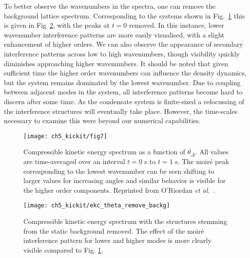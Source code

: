     To better observe the wavenumbers in the spectra, one can remove the background lattice spectrum. Corresponding to the systems shown in Fig.~\ref{fig:dtheta_kspec} this is given in Fig~\ref{fig:dtheta_kspec_backg}, with the peaks at $t=0$ removed. In this instance, lower wavenumber interference patterns are more easily visualised, with a slight enhancement of higher orders. We can also observe the appearance of secondary interference patterns across low to high wavenumbers, though visibility quickly diminishes approaching higher wavenumbers. It should be noted that given sufficient time the higher order wavenumbers can influence the density dynamics, but the system remains dominated by the lowest wavenumber. Due to coupling between adjacent modes in the system, all interference patterns become hard to discern after some time. As the condensate system is finite-sized a refocussing of the interference structures will eventually take place. However, the time-scales necessary to examine this were beyond our numerical capabilities.


	\begin{figure}
        \centering
		\texttt{[image: ch5\_kickit/fig7]}
		\caption[Compressible kinetic energy spectrum as a function of $\theta_\Delta$.]{Compressible kinetic energy spectrum as a function of $\theta_\Delta$. All values are time-averaged over an interval $t=0$ s to $t=1$ s. The moir\'e peak corresponding to the lowest wavenumber can be seen shifting to larger values for increasing angles and similar behavior is visible for the higher order components. Reprinted from O'Riordan {\textit{et al}.}~\cite{VTX:oriordan_pra_2016}.}
		\label{fig:dtheta_kspec}
	\end{figure}
    \begin{figure}
        \centering
        \texttt{[image: ch5\_kickit/ekc\_theta\_remove\_backg]}
        \caption[Compressible kinetic energy spectrum with the background structure removed.]{Compressible kinetic energy spectrum with the structures stemming from the static background removed. The effect of the moir\'e interference pattern for lower and higher modes is more clearly visible compared to Fig. \ref{fig:dtheta_kspec}.}
        \label{fig:dtheta_kspec_backg}
    \end{figure}

